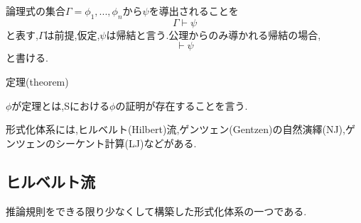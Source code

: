 論理式の集合$\Gamma={\phi_1,...,\phi_n}$から$\psi$を導出されることを
\begin{equation*}
 \Gamma \vdash \psi
\end{equation*}
と表す,$\Gamma$は前提,仮定,$\psi$は帰結と言う.公理からのみ導かれる帰結の場合,
\begin{equation*}
 \vdash \psi
\end{equation*}
と書ける.

\begin{dfn}
 定理(theorem)

 $\phi$が定理とは,Sにおける$\phi$の証明が存在することを言う.
\end{dfn}

形式化体系には,ヒルベルト(Hilbert)流,ゲンツェン(Gentzen)の自然演繹(NJ),ゲンツェンのシーケント計算(LJ)などがある.
\subsection{ヒルベルト流}
推論規則をできる限り少なくして構築した形式化体系の一つである.
